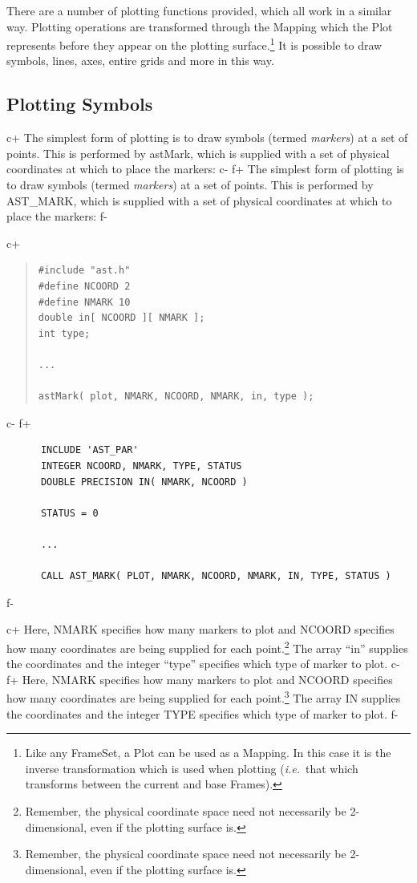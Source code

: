 \documentclass[twoside,11pt]{article}
\begin{document}
There are a number of plotting functions provided, which all work in a
similar way. Plotting operations are transformed through the Mapping
which the Plot represents before they appear on the plotting
surface.\footnote{Like any FrameSet, a Plot can be used as a
Mapping. In this case it is the inverse transformation which is used
when plotting ({\em{i.e.}}\ that which transforms between the current
and base Frames).}  It is possible to draw symbols, lines, axes,
entire grids and more in this way.


\subsection{Plotting Symbols}

c+
The simplest form of plotting is to draw symbols (termed
{\em{markers}}) at a set of points. This is performed by astMark,
which is supplied with a set of physical coordinates at which to place
the markers:
c-
f+
The simplest form of plotting is to draw symbols (termed
{\em{markers}}) at a set of points. This is performed by AST\_MARK,
which is supplied with a set of physical coordinates at which to place
the markers:
f-

c+
\begin{quote}
\small
\begin{verbatim}
#include "ast.h"
#define NCOORD 2
#define NMARK 10
double in[ NCOORD ][ NMARK ];
int type;

...

astMark( plot, NMARK, NCOORD, NMARK, in, type );
\end{verbatim}
\normalsize
\end{quote}
c-
f+
\small
\begin{verbatim}
      INCLUDE 'AST_PAR'
      INTEGER NCOORD, NMARK, TYPE, STATUS
      DOUBLE PRECISION IN( NMARK, NCOORD )

      STATUS = 0

      ...

      CALL AST_MARK( PLOT, NMARK, NCOORD, NMARK, IN, TYPE, STATUS )
\end{verbatim}
\normalsize
f-

c+
Here, NMARK specifies how many markers to plot and NCOORD specifies
how many coordinates are being supplied for each
point.\footnote{Remember, the physical coordinate space need not
necessarily be 2-dimensional, even if the plotting surface is.} The
array ``in'' supplies the coordinates and the integer ``type''
specifies which type of marker to plot.
c-
f+
Here, NMARK specifies how many markers to plot and NCOORD specifies
how many coordinates are being supplied for each
point.\footnote{Remember, the physical coordinate space need not
necessarily be 2-dimensional, even if the plotting surface is.} The
array IN supplies the coordinates and the integer TYPE specifies which
type of marker to plot.
f-
\end{document}
